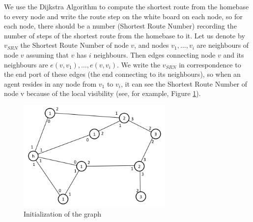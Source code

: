 We use the Dijkstra Algorithm to compute the shortest route from the homebase to every node and write the route step on the white board on each node, so for each node, there should be a number (Shortest Route Number) recording the number of steps of the shortest route from the homebase to it. Let us denote by $v_{SRN}$ the Shortest Route Number of node $v$, and nodes ${v_1, \ldots, v_i}$ are neighbours of node $v$ assuming that $v$ has $i$ neighbours. Then edges connecting node $v$ and its neighbours are $e(v, v_1), \ldots, e(v, v_i)$. We write the $v_{SRN}$ in correspondence to the   end port of these edges (the end connecting to its neighbours), so when an agent resides in any node from $v_1$ to $v_i$, it can see the Shortest Route Number of node v because of the local visibility (see, for example,   Figure \ref{fig:Arbi1}).

\begin{figure}[H]
  \centering  
  \includegraphics[width=3in]{figures/Arbi1.png}
  \caption{Initialization of the graph}\label{fig:Arbi1}
\end{figure}

